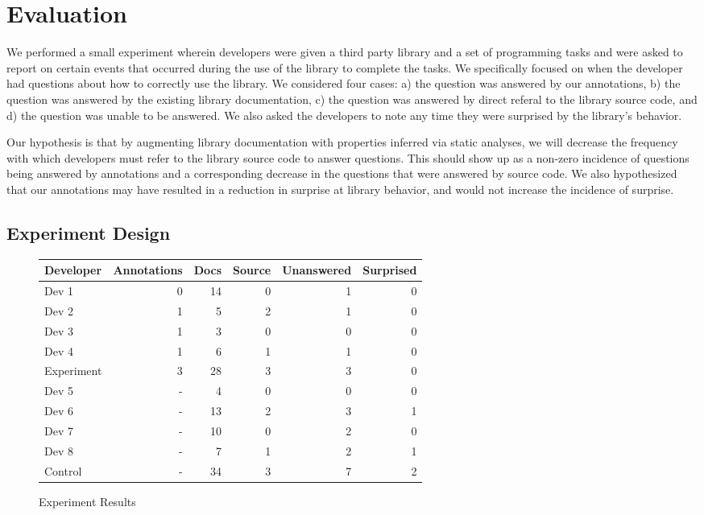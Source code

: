 \section{Evaluation}
\label{sec:Evaluation}

We performed a small experiment wherein developers were given a third party
library and a set of programming tasks and were asked to report on certain
events that occurred during the use of the library to complete the tasks. We
specifically focused on when the developer had questions about how to correctly
use the library. We considered four cases: a) the question was answered by our
annotations, b) the question was answered by the existing library
documentation, c) the question was answered by direct referal to the library
source code, and d) the question was unable to be answered. We also asked the
developers to note any time they were surprised by the library's behavior.

Our hypothesis is that by augmenting library documentation with properties
inferred via static analyses, we will decrease the frequency with which
developers must refer to the library source code to answer questions. This
should show up as a non-zero incidence of questions being answered by
annotations and a corresponding decrease in the questions that were answered by
source code. We also hypothesized that our annotations may have resulted in a
reduction in surprise at library behavior, and would not increase the incidence
of surprise.

\subsection{Experiment Design}

\begin{figure*}
\centering
\begin{tabular}{ l r r r r r }
Developer & Annotations & Docs & Source & Unanswered & Surprised \\
\hline
Dev 1 & 0 & 14 & 0 & 1 & 0 \\
Dev 2 & 1 &  5 & 2 & 1 & 0 \\
Dev 3 & 1 &  3 & 0 & 0 & 0 \\
Dev 4 & 1 &  6 & 1 & 1 & 0 \\
\hline
Experiment & 3 & 28 & 3 & 3 & 0 \\
\hline
Dev 5 & - &  4 & 0 & 0 & 0 \\
Dev 6 & - & 13 & 2 & 3 & 1 \\
Dev 7 & - & 10 & 0 & 2 & 0 \\
Dev 8 & - &  7 & 1 & 2 & 1 \\
\hline
Control & - & 34 & 3 & 7 & 2 \\
\hline
\end{tabular}
\caption{Experiment Results}
\label{fig:exp_results}
\end{figure*}

